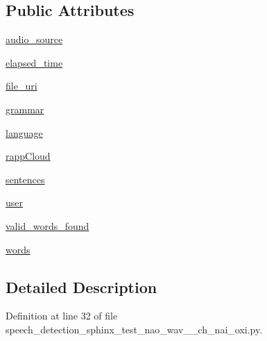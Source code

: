 \subsection*{Public Attributes}
\begin{DoxyCompactItemize}
\item 
\hyperlink{classspeech__detection__sphinx__test__nao__wav__1__ch__nai__oxi_1_1RappInterfaceTest_abfa9d506e4d003f810cae31d37279bf9}{audio\-\_\-source}
\item 
\hyperlink{classspeech__detection__sphinx__test__nao__wav__1__ch__nai__oxi_1_1RappInterfaceTest_a12008a9124af09692d73afffe8274e2b}{elapsed\-\_\-time}
\item 
\hyperlink{classspeech__detection__sphinx__test__nao__wav__1__ch__nai__oxi_1_1RappInterfaceTest_a2544a3f8c0792c1d2dc1326ceb7948d8}{file\-\_\-uri}
\item 
\hyperlink{classspeech__detection__sphinx__test__nao__wav__1__ch__nai__oxi_1_1RappInterfaceTest_ac215aa01525e2069a9a27fa892f3cc74}{grammar}
\item 
\hyperlink{classspeech__detection__sphinx__test__nao__wav__1__ch__nai__oxi_1_1RappInterfaceTest_a2f5a5314c0930940ac58450bee5d1138}{language}
\item 
\hyperlink{classspeech__detection__sphinx__test__nao__wav__1__ch__nai__oxi_1_1RappInterfaceTest_a76b5068fa224f5daea67f0f6aad6ba05}{rapp\-Cloud}
\item 
\hyperlink{classspeech__detection__sphinx__test__nao__wav__1__ch__nai__oxi_1_1RappInterfaceTest_aa470013a2565ab2cb65d290791c72f35}{sentences}
\item 
\hyperlink{classspeech__detection__sphinx__test__nao__wav__1__ch__nai__oxi_1_1RappInterfaceTest_a8f4c56ce19bab9f4c9334c06037240b2}{user}
\item 
\hyperlink{classspeech__detection__sphinx__test__nao__wav__1__ch__nai__oxi_1_1RappInterfaceTest_aa7061b75d4559d98441c68e669c2f048}{valid\-\_\-words\-\_\-found}
\item 
\hyperlink{classspeech__detection__sphinx__test__nao__wav__1__ch__nai__oxi_1_1RappInterfaceTest_a93f3bf9612bf3b203c4a40874569cd56}{words}
\end{DoxyCompactItemize}


\subsection{Detailed Description}


Definition at line 32 of file speech\-\_\-detection\-\_\-sphinx\-\_\-test\-\_\-nao\-\_\-wav\-\_\-\_\-ch\-\_\-nai\-\_\-oxi.\-py.



